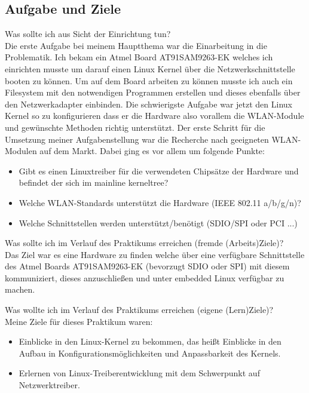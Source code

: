 \documentclass[pdftex,12pt,a4paper]{scrreprt}
\begin{document}
\subsection{Aufgabe und Ziele}
Was sollte ich aus Sicht der Einrichtung tun?\\
Die erste Aufgabe bei meinem Hauptthema war die Einarbeitung in die Problematik. Ich bekam ein Atmel Board AT91SAM9263-EK welches ich einrichten musste
um darauf einen Linux Kernel über die Netzwerkschnittstelle booten zu können. Um auf dem Board arbeiten zu können musste ich auch ein Filesystem mit den 
notwendigen Programmen erstellen und dieses ebenfalls über den Netzwerkadapter einbinden. Die schwierigste Aufgabe war jetzt den Linux Kernel so zu konfigurieren dass er die Hardware also vorallem die WLAN-Module und gewünschte Methoden richtig unterstützt.
Der erste Schritt für die Umsetzung meiner Aufgabenstellung war die Recherche nach geeigneten WLAN-Modulen auf dem Markt.
Dabei ging es vor allem um folgende Punkte:\\
\begin{itemize}
 \item Gibt es einen Linuxtreiber für die verwendeten Chipsätze der Hardware und befindet der sich im mainline kerneltree?
 \item Welche WLAN-Standards unterstützt die Hardware (IEEE 802.11 a/b/g/n)?
 \item Welche Schnittstellen werden unterstützt/benötigt (SDIO/SPI oder PCI ...)
\end{itemize}

Was sollte ich im Verlauf des Praktikums erreichen (fremde (Arbeits)Ziele)?\\
Das Ziel war es eine Hardware zu finden welche über eine verfügbare Schnittstelle des Atmel Boards AT91SAM9263-EK (bevorzugt SDIO oder SPI) mit diesem kommuniziert, dieses anzuschließen und unter embedded Linux verfügbar zu machen.

Was wollte ich im Verlauf des Praktikums erreichen (eigene (Lern)Ziele)?\\
Meine Ziele für dieses Praktikum waren:
\begin{itemize}
 \item Einblicke in den Linux-Kernel zu bekommen, das heißt Einblicke in den Aufbau in Konfigurationsmöglichkeiten und Anpassbarkeit des Kernels.
 \item Erlernen von Linux-Treiberentwicklung mit dem Schwerpunkt auf Netzwerktreiber.

\end{itemize}
\end{document}
